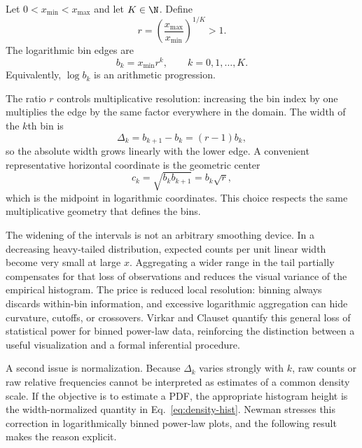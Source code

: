 \begin{definition}
Let $0<x_{\min}<x_{\max}$ and let $K\in\N$. Define
\begin{equation}
 r=\left(\frac{x_{\max}}{x_{\min}}\right)^{1/K}>1.
\end{equation}
The logarithmic bin edges are
\begin{equation}
 b_k=x_{\min}r^k,
 \qquad k=0,1,\ldots,K.
\label{eq:log-edges}
\end{equation}
Equivalently, $\log b_k$ is an arithmetic progression.
\end{definition}

The ratio $r$ controls multiplicative resolution: increasing the bin index by one multiplies the edge by the same factor everywhere in the domain. The width of the $k$th bin is
\begin{equation}
 \Delta_k=b_{k+1}-b_k=(r-1)b_k,
\label{eq:log-width}
\end{equation}
so the absolute width grows linearly with the lower edge. A convenient representative horizontal coordinate is the geometric center
\begin{equation}
 c_k=\sqrt{b_kb_{k+1}}=b_k\sqrt{r},
\end{equation}
which is the midpoint in logarithmic coordinates. This choice respects the same multiplicative geometry that defines the bins.

The widening of the intervals is not an arbitrary smoothing device. In a decreasing heavy-tailed distribution, expected counts per unit linear width become very small at large $x$. Aggregating a wider range in the tail partially compensates for that loss of observations and reduces the visual variance of the empirical histogram. The price is reduced local resolution: binning always discards within-bin information, and excessive logarithmic aggregation can hide curvature, cutoffs, or crossovers. Virkar and Clauset \cite{VirkarClauset2014} quantify this general loss of statistical power for binned power-law data, reinforcing the distinction between a useful visualization and a formal inferential procedure.

A second issue is normalization. Because $\Delta_k$ varies strongly with $k$, raw counts or raw relative frequencies cannot be interpreted as estimates of a common density scale. If the objective is to estimate a PDF, the appropriate histogram height is the width-normalized quantity in Eq.~\eqref{eq:density-hist}. Newman \cite{Newman2005} stresses this correction in logarithmically binned power-law plots, and the following result makes the reason explicit.

